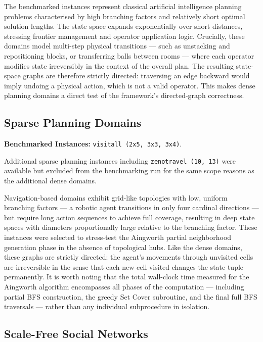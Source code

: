 The benchmarked instances represent classical artificial intelligence planning problems characterised by high branching factors and relatively short optimal solution lengths. The state space expands exponentially over short distances, stressing frontier management and operator application logic. Crucially, these domains model multi-step physical transitions --- such as unstacking and repositioning blocks, or transferring balls between rooms --- where each operator modifies state irreversibly in the context of the overall plan. The resulting state-space graphs are therefore strictly directed: traversing an edge backward would imply undoing a physical action, which is not a valid operator. This makes dense planning domains a direct test of the framework's directed-graph correctness.

\subsection{Sparse Planning Domains}

\textbf{Benchmarked Instances:} \texttt{visitall (2x5, 3x3, 3x4)}.

Additional sparse planning instances including \texttt{zenotravel (10, 13)} were available but excluded from the benchmarking run for the same scope reasons as the additional dense domains.

Navigation-based domains exhibit grid-like topologies with low, uniform branching factors --- a robotic agent transitions in only four cardinal directions --- but require long action sequences to achieve full coverage, resulting in deep state spaces with diameters proportionally large relative to the branching factor. These instances were selected to stress-test the Aingworth partial neighborhood generation phase in the absence of topological hubs. Like the dense domains, these graphs are strictly directed: the agent's movements through unvisited cells are irreversible in the sense that each new cell visited changes the state tuple permanently. It is worth noting that the total wall-clock time measured for the Aingworth algorithm encompasses all phases of the computation --- including partial BFS construction, the greedy Set Cover subroutine, and the final full BFS traversals --- rather than any individual subprocedure in isolation.

\subsection{Scale-Free Social Networks}

